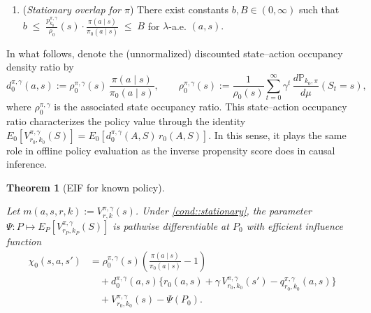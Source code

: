 \documentclass[12pt]{article}
\DeclareMathOperator*{\esssup}{ess\,sup}
\theoremstyle{plain}
\newtheorem{theorem}{Theorem}
\begin{document}
 
\begin{enumerate}[label=\textbf{(D\arabic*)}, ref=D\arabic*, series=condexample]
    \item (\textit{Stationary overlap for $\pi$}) There exist constants $b, B \in (0,\infty)$ such that  $b \;\le\; \frac{p_{k_0}^{\pi,\gamma}}{\rho_0}(s) \cdot \frac{\pi(a \mid s)}{\pi_0(a \mid s)} \;\le\; B $ for $\lambda$-a.e. $(a,s).$ \label{cond::stationary}
\end{enumerate}
 



In what follows, denote the (unnormalized) discounted state–action occupancy density ratio by
\begin{equation}
    d_0^{\pi,\gamma}(a,s)
    := \rho_0^{\pi,\gamma}(s)\,\frac{\pi(a \mid s)}{\pi_0(a \mid s)}, 
    \qquad 
    \rho_0^{\pi,\gamma}(s)
    := \frac{1}{\rho_0(s)}\sum_{t=0}^\infty \gamma^t\,
       \frac{d\mathbb{P}_{k_0,\pi}}{d\mu}(S_t = s),
    \label{eqn::occupancy}
\end{equation}
where $\rho_0^{\pi,\gamma}$ is the associated state occupancy ratio.
This state–action occupancy ratio characterizes the policy value through the identity
$E_0[V_{r_0,k_0}^{\pi,\gamma}(S)] = E_0[d_0^{\pi,\gamma}(A,S)\,r_0(A,S)]$.
In this sense, it plays the same role in offline policy evaluation as the inverse 
propensity score does in causal inference.
 


 


 
 

 

 
 
\begingroup
 
   
\begin{theorem}[EIF for known policy]
\label{theorem::EIFvalue}
 
   Let  $m(a,s,r,k) := V_{r,k}^{\pi,\gamma}(s)$. Under \ref{cond::stationary}, the parameter $\Psi: P \mapsto E_P[V_{r_P, k_P}^{\pi,\gamma}(S)]$ is pathwise differentiable at $P_0$ with efficient influence function
    \begin{align*}
    \chi_0(s,a,s') 
    &= \rho_0^{\pi,\gamma}(s)\!\left(\frac{\pi(a\mid s)}{\pi_0(a\mid s)}-1\right) \\[4pt]
     & \quad + d_0^{\pi,\gamma}(a,s)\Big\{r_0(a,s) + \gamma\,V_{r_0,k_0}^{\pi,\gamma}(s')
     - q_{r_0,k_0}^{\pi,\gamma}(a,s)\Big\} \\[4pt]
     & \quad + V_{r_0, k_0}^{\pi,\gamma}(s) - \Psi(P_0).
    \end{align*}

\end{theorem}
\endgroup
 
\end{document}
